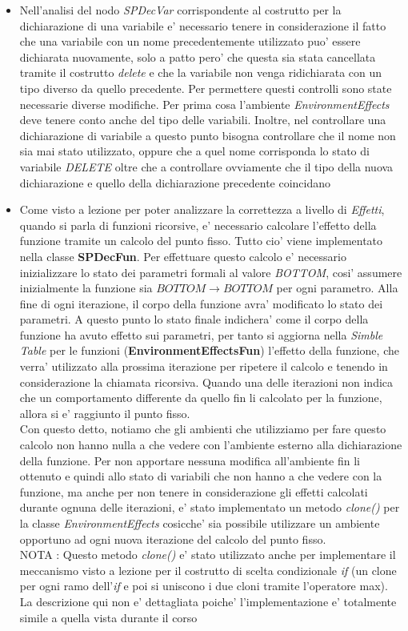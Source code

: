 \documentclass{article}
\begin{document}
\begin{itemize}
    \item Nell'analisi del nodo \textit{SPDecVar} corrispondente al costrutto per la dichiarazione di una variabile e' necessario tenere in considerazione il fatto che una variabile con un nome precedentemente utilizzato puo' essere dichiarata nuovamente, solo a patto pero' che questa sia stata cancellata tramite il costrutto \textit{delete} e che la variabile non venga ridichiarata con un tipo diverso da quello precedente. Per permettere questi controlli sono state necessarie diverse modifiche. Per prima cosa l'ambiente \textit{EnvironmentEffects} deve tenere conto anche del tipo delle variabili. Inoltre, nel controllare una dichiarazione di variabile a questo punto bisogna controllare che il nome non sia mai stato utilizzato, oppure che a quel nome corrisponda lo stato di variabile \textit{DELETE} oltre che a controllare ovviamente che il tipo della nuova dichiarazione e quello della dichiarazione precedente coincidano
    \item Come visto a lezione per poter analizzare la correttezza a livello di \textit{Effetti}, quando si parla di funzioni ricorsive, e' necessario calcolare l'effetto della funzione tramite un calcolo del punto fisso. Tutto cio' viene implementato nella classe \textbf{SPDecFun}. Per effettuare questo calcolo e' necessario inizializzare lo stato dei parametri formali al valore \textit{BOTTOM}, cosi' assumere inizialmente la funzione sia 
    $BOTTOM \rightarrow BOTTOM$ per ogni parametro. Alla fine di ogni iterazione, il corpo della funzione avra' modificato lo stato dei parametri. A questo punto lo stato finale indichera' come il corpo della funzione ha avuto effetto sui parametri, per tanto si aggiorna nella
    \textit{Simble Table} per le funzioni
    (\textbf{EnvironmentEffectsFun}) 
    l'effetto della funzione, che verra' utilizzato alla prossima iterazione per ripetere il calcolo e tenendo in considerazione la chiamata ricorsiva. Quando una delle iterazioni non indica che un comportamento differente da quello fin li calcolato per la funzione, allora si e' raggiunto il punto fisso. \\ 
    Con questo detto, notiamo che gli ambienti che utilizziamo per fare questo calcolo non hanno nulla a che vedere con l'ambiente esterno alla dichiarazione della funzione. Per non apportare nessuna modifica all'ambiente fin li ottenuto e quindi allo stato di variabili che non hanno a che vedere con la funzione, ma anche per non tenere in considerazione gli effetti calcolati durante ognuna delle iterazioni, e' stato implementato un metodo \textit{clone()} per la classe \textit{EnvironmentEffects} cosicche' sia possibile utilizzare un ambiente opportuno ad ogni nuova iterazione del calcolo del punto fisso.\\
    NOTA : Questo metodo \textit{clone()} e' stato utilizzato anche per implementare il meccanismo visto a lezione per il costrutto di scelta condizionale \textit{if} (un clone per ogni ramo dell'\textit{if} e poi si uniscono i due cloni tramite l'operatore max). La descrizione qui non e' dettagliata poiche' l'implementazione e' totalmente simile a quella vista durante il corso
\end{itemize}
\end{document}
